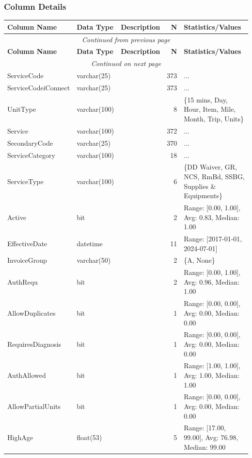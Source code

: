 \begin{landscape}
\subsubsection{Column Details}
\begin{longtable}{|l|l|l|r|p{6cm}|}
\hline
\textbf{Column Name} & \textbf{Data Type} & \textbf{Description} & \textbf{N} & \textbf{Statistics/Values} \\
\hline
\endfirsthead
\multicolumn{5}{c}{\textit{Continued from previous page}} \\
\hline
\textbf{Column Name} & \textbf{Data Type} & \textbf{Description} & \textbf{N} & \textbf{Statistics/Values} \\
\hline
\endhead
\hline
\multicolumn{5}{c}{\textit{Continued on next page}} \\
\endfoot
\hline
\endlastfoot
ServiceCode & varchar(25) &  & 373 & ... \\
\hline
ServiceCodeiConnect & varchar(25) &  & 373 & ... \\
\hline
UnitType & varchar(100) &  & 8 & \{15 mins, Day, Hour, Item, Mile, Month, Trip, Units\} \\
\hline
Service & varchar(100) &  & 372 & ... \\
\hline
SecondaryCode & varchar(25) &  & 370 & ... \\
\hline
ServiceCategory & varchar(100) &  & 18 & ... \\
\hline
ServiceType & varchar(100) &  & 6 & \{DD Waiver, GR, NCS, RmBd, SSBG, Supplies \& Equipments\} \\
\hline
Active & bit &  & 2 & Range: [0.00, 1.00], Avg: 0.83, Median: 1.00 \\
\hline
EffectiveDate & datetime &  & 11 & Range: [2017-01-01, 2024-07-01] \\
\hline
InvoiceGroup & varchar(50) &  & 2 & \{A, None\} \\
\hline
AuthRequ & bit &  & 2 & Range: [0.00, 1.00], Avg: 0.96, Median: 1.00 \\
\hline
AllowDuplicates & bit &  & 1 & Range: [0.00, 0.00], Avg: 0.00, Median: 0.00 \\
\hline
RequiresDiagnosis & bit &  & 1 & Range: [0.00, 0.00], Avg: 0.00, Median: 0.00 \\
\hline
AuthAllowed & bit &  & 1 & Range: [1.00, 1.00], Avg: 1.00, Median: 1.00 \\
\hline
AllowPartialUnits & bit &  & 1 & Range: [0.00, 0.00], Avg: 0.00, Median: 0.00 \\
\hline
HighAge & float(53) &  & 5 & Range: [17.00, 99.00], Avg: 76.98, Median: 99.00 \\

\end{longtable}
\end{landscape}
